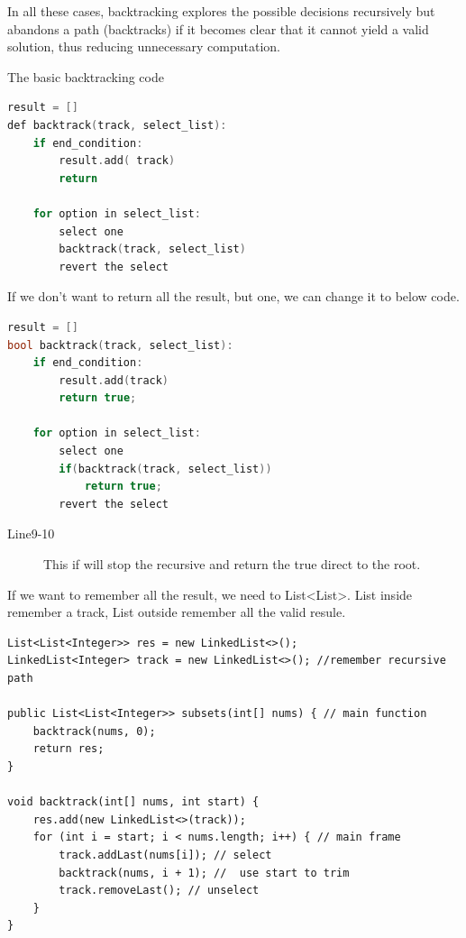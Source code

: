 \documentclass[a4paper,11pt,twoside]{book}
\begin{document}
\par In all these cases, backtracking explores the possible decisions recursively but abandons a path (backtracks) if it becomes clear that it cannot yield a valid solution, thus reducing unnecessary computation.

	
	\par The basic backtracking code
\begin{lstlisting}[frame=single, language=c++]
result = []
def backtrack(track, select_list):
	if end_condition:
		result.add( track)
		return

	for option in select_list:
		select one
		backtrack(track, select_list)
		revert the select	
\end{lstlisting}


	\par If we don't want to return all the result, but one, we can change it to below code. 
\begin{lstlisting}[frame=single, language=c++]
result = []
bool backtrack(track, select_list):
	if end_condition:
		result.add(track)
		return true;
	
	for option in select_list:
		select one
		if(backtrack(track, select_list))
			return true;
		revert the select	
\end{lstlisting}
\begin{description}
	\item[Line9-10] This if will stop the recursive and return the true direct to the root.
\end{description}

	\par If we want to remember all the result, we need to List<List>. List inside remember a track, List outside remember all the valid resule. 

\begin{lstlisting}
List<List<Integer>> res = new LinkedList<>();
LinkedList<Integer> track = new LinkedList<>(); //remember recursive path

public List<List<Integer>> subsets(int[] nums) { // main function
	backtrack(nums, 0);
	return res;
}

void backtrack(int[] nums, int start) {
	res.add(new LinkedList<>(track));
	for (int i = start; i < nums.length; i++) { // main frame
		track.addLast(nums[i]); // select
		backtrack(nums, i + 1); //  use start to trim
		track.removeLast(); // unselect
	}
}
\end{lstlisting}
\end{document}
